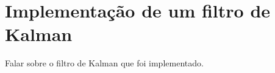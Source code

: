 \chapter{Implementação de um filtro de Kalman}\label{cap:kalman}

Falar sobre o filtro de Kalman que foi implementado.



